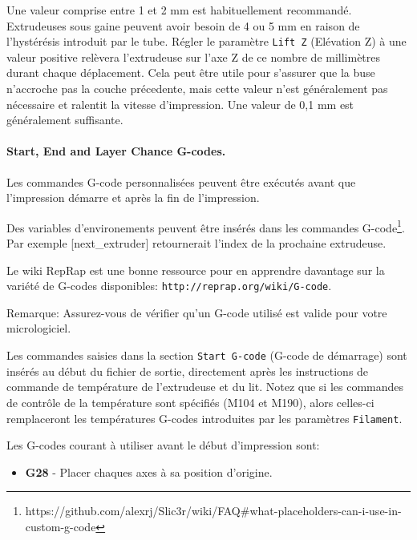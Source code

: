 Une valeur comprise entre 1 et 2 mm est habituellement recommandé. Extrudeuses sous gaine peuvent avoir besoin de 4 ou 5 mm en raison de l'hystérésis introduit par le tube.
Régler le paramètre \texttt{Lift Z} (Elévation Z) à une valeur positive relèvera l'extrudeuse sur l'axe Z de ce nombre de millimètres durant chaque déplacement. Cela peut être utile pour s'assurer que la buse n'accroche pas la couche précedente, mais cette valeur n'est généralement pas nécessaire et ralentit la vitesse d'impression. Une valeur de 0,1 mm est généralement suffisante.

\paragraph{Start, End and Layer Chance G-codes.} %
\label{par:start_end_g_code}
Les commandes G-code personnalisées peuvent être exécutés avant que l'impression démarre et après la fin de l'impression.

Des variables d'environements peuvent être insérés dans les commandes G-code\footnote{https://github.com/alexrj/Slic3r/wiki/FAQ\#what-placeholders-can-i-use-in-custom-g-code}.  Par exemple [next\_extruder] retournerait l'index de la prochaine extrudeuse.

Le wiki RepRap est une bonne ressource pour en apprendre davantage sur la variété de G-codes disponibles: \texttt{http://reprap.org/wiki/G-code}.

Remarque: Assurez-vous de vérifier qu'un G-code utilisé est valide pour votre micrologiciel.

Les commandes saisies dans la section \texttt{Start G-code} (G-code de démarrage) 
sont insérés au début du fichier de sortie, directement après les instructions de commande de température de l'extrudeuse et du lit. Notez que si les commandes de contrôle de la température sont spécifiés (M104 et M190), alors celles-ci remplaceront les températures G-codes introduites par les paramètres \texttt{Filament}.

Les G-codes courant à utiliser avant le début d'impression sont:
\begin{itemize}
	\item \textbf{G28}  - Placer chaques axes à sa position d'origine.
\end{itemize}


